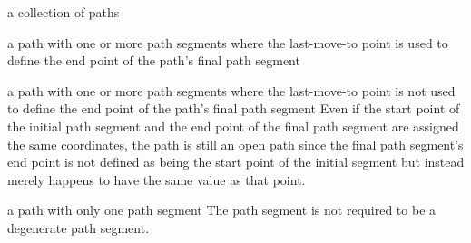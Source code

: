 a collection of paths

a path with one or more path segments where the last-move-to point is used to define the end point of the path's final path segment

a path with one or more path segments where the last-move-to point is not used to define the end point of the path's final path segment
\enternote
Even if the start point of the initial path segment and the end point of the final path segment are assigned the same coordinates, the path is still an open path since the final path segment's end point is not defined as being the start point of the initial segment but instead merely happens to have the same value as that point.
\exitnote

a path with only one path segment
\enternote
The path segment is not required to be a degenerate path segment.
\exitnote
